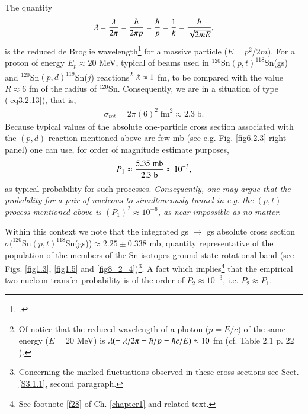 The quantity
\begin{align}\label{eq3.2.16}
\lambdabar=\frac{\lambda}{2\pi}=\frac{h}{2\pi p}=\frac{\hbar}{p}=\frac{1}{k}=\frac{\hbar}{\sqrt{2mE}},
\end{align}
is the reduced de Broglie wavelength\footnote{\cite{Broglie:25}.} for a massive particle ($E=p^2/2m$). For a proton of energy $E_p\approx 20$ MeV, typical of beams used in $^{120}$Sn$(p,t)^{118}$Sn(gs) and $^{120}$Sn$(p,d)^{119}$Sn($j$) reactions\footnote{Of notice that the reduced wavelength of a photon ($p=E/c$) of the same energy ($E= 20$ MeV) is $\lambdabar (=\lambda/2\pi=\hbar/p=\hbar c/E)\approx 10$ fm (cf. Table 2.1 p. 22 \cite{Satchler:80}).} $\lambdabar\approx 1$ fm, to be compared with the value $R\approx 6$ fm of the radius of $^{120}$Sn. Consequently, we are in a situation of type (\ref{eq3.2.13}), that is,
\begin{align}
\sigma_{tot}=2\pi(6)^2\;\text{fm}^2\approx 2.3\;\text{b}.
\end{align}
Because typical values of the absolute one-particle cross section associated  with the $(p,d)$ reaction mentioned above are few mb (see e.g. Fig. \ref{fig6.2.3} right panel) one can use, for order of magnitude estimate purposes,  
\begin{align}\label{eq4.2.12}
P_1\approx\frac{5.35\; \text{mb}}{2.3\;\text{b}}\approx 10^{-3}, \idx{Two-nucleon transfer!one- and two-particle transfer probabilities}
\end{align}
as  typical probability for such processes. \textit{Consequently, one may argue that the probability for a  pair of nucleons to simultaneously tunnel in e.g. the $(p,t)$ process mentioned above is $(P_1)^2\approx10^{-6}$, as near impossible as no matter}. 


Within this context we note that the integrated gs $\rightarrow$ gs absolute cross section $\sigma(^{120}$Sn$(p,t)^{118}$Sn(gs))$\approx 2.25 \pm$0.338 mb, quantity representative of the population of the members of the  Sn-isotopes ground state rotational band (see Figs. \ref{fig1.3}, \ref{fig1.5} and \ref{fig8_2_4})\footnote{Concerning the marked fluctuations observed in these cross sections see Sect. \ref{S3.1.1}, second paragraph.}. A fact which implies\footnote{See footnote \ref{f28} of Ch. \ref{chapter1} and related text.} that the empirical two-nucleon transfer probability is of the order of $P_2\approx 10^{-3}$, i.e. $P_2\approx P_1$. 




